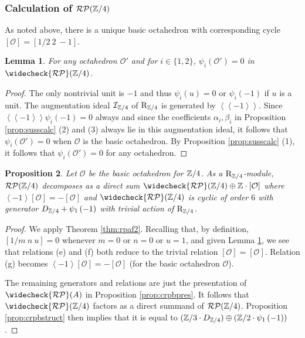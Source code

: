 \documentclass[12pt]{amsart}
\newtheorem{lem}{Lemma}[section]
\newtheorem{prop}[lem]{Proposition}
\theoremstyle{definition}
\newcommand{\Z}{\Bbb{Z}}
\newcommand{\oct}{\mathcal{O}}%
\newcommand{\scyc}[1]{\left[ #1 \right]} %
\newcommand{\rpb}[1]{\mathcal{RP}(#1)}%
\newcommand{\crpb}[1]{\widecheck{\mathcal{RP}}(#1)}
\newcommand{\suss}[2]{\psi_{#1}\left( #2\right)}
\newcommand{\cconst}[1]{D_{#1}}
\newcommand{\<}{\langle}
\renewcommand{\>}{\rangle}
\newcommand{\sgr}[1]{\mathrm{R}_{#1}}%
\newcommand{\an}[1]{\left\langle{#1}\right\rangle}
\newcommand{\pf}[1]{\left\langle\!\left\langle{#1}\right\rangle\!\right\rangle}
\newcommand{\aug}[1]{\mathcal{I}_{#1}}
\begin{document}
\subsubsection{Calculation of $\rpb{\Z/4}$}  

As noted above, there is a unique basic octahedron with corresponding cycle
 $\scyc{\oct}=\scyc{ 1/2\ 2\ -1}$.

\begin{lem}\label{lem:octz4} For any octahedron $\oct'$ and for $i\in \{ 1,2\}$, $\suss{i}{\oct'}=0$ in $\crpb{\Z/4}$. 
\end{lem}
\begin{proof} The only nontrivial unit is $-1$ and thus $\suss{i}{u}=0$ or $\suss{i}{-1}$ if $u$ is a unit. The augmentation ideal $\aug{\Z/4}$ of $\sgr{\Z/4}$ is generated by $\pf{-1}$.
Since $\pf{-1}\suss{i}{-1}=0$ always and since the coefficients $\alpha_i,\beta_i$ in Proposition \ref{prop:susscalc} (2) and (3) always lie in this augmentation ideal, it follows that 
$\suss{i}{\oct'}=0$ when $\oct$ is the basic octahedron. By Proposition \ref{prop:susscalc} (1), it follows that $\suss{i}{\oct'}=0$ for any octahedron.
\end{proof}

\begin{prop} Let $\oct$ be the basic octahedron for $\Z/4$. As a $\sgr{\Z/4}$-module, $\rpb{\Z/4}$ decomposes as a direct sum $\crpb{\Z/4}\oplus \Z\cdot\scyc{\oct}$ where
$\an{-1}\scyc{\oct}=-\scyc{\oct}$ and $\crpb{\Z/4}$ is cyclic of order $6$ with generator $\cconst{\Z/4}+\suss{1}{-1}$ with trivial action of $\sgr{\Z/4}$.
\end{prop}

\begin{proof} We apply Theorem \ref{thm:rpaf2}. Recalling that, by definition, $\scyc{1/m\ n\ u}= 0$ whenever $m=0$ or $n=0$ or $u=1$, and given Lemma \ref{lem:octz4}, we see that 
relations (e) and (f) both reduce to the trivial relation $\scyc{\oct}=\scyc{\oct}$. Relation (g) becomes $\an{-1}\scyc{\oct}=-\scyc{\oct}$ (for the basic octahedron  $\oct$). 

The remaining generators and relations are just the presentation of $\crpb{A}$ in Proposition \ref{prop:crpbpres}. It follows that $\crpb{\Z/4}$ factors as a direct summand of $\rpb{\Z/4}$.
Proposition \ref{prop:crpbstruct} then implies that it is equal to $(\Z/3\cdot\cconst{\Z/4})\oplus (\Z/2\cdot \suss{1}{-1})$. 
\end{proof}
\end{document}

